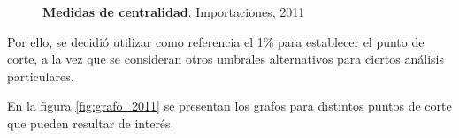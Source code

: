 \documentclass[a4paper]{article}
\begin{document}
\begin{figure}
\centering
{}
\caption{\textbf{Medidas de centralidad}. Importaciones, 2011}
\label{fig:centralidad_2011}
\end{figure}


Por ello, se decidió utilizar como referencia el 1\% para establecer el punto de corte, a la vez que se consideran otros umbrales alternativos para ciertos análisis particulares.

En la figura \ref{fig:grafo_2011} se presentan los grafos para distintos puntos de corte que pueden resultar de interés.
\end{document}
